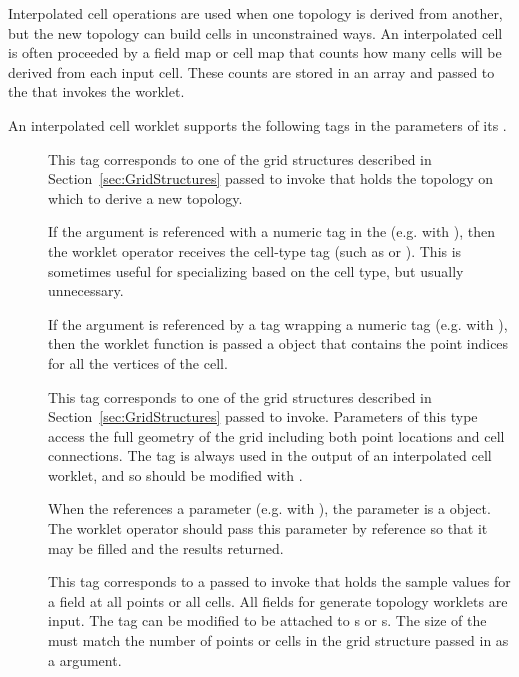 Interpolated cell operations are used when one topology is derived from
another, but the new topology can build cells in unconstrained ways. An
interpolated cell is often proceeded by a field map or cell map that counts
how many cells will be derived from each input cell. These counts are
stored in an array and passed to the 
that invokes the worklet.

An interpolated cell worklet supports the following tags in the parameters
of its \controlsignature.
\begin{description}
\item[] This tag corresponds to one of the grid structures
  described in Section~\ref{sec:GridStructures} passed to invoke that holds
  the topology on which to derive a new topology.

  If the  argument is referenced with a numeric tag in the
  \executionsignature (e.g. with ), then the worklet operator
  receives the cell-type tag (such as  or
  ). This is sometimes useful for specializing   based
  on the cell type, but usually unnecessary.

  If the  argument is referenced by a 
  tag wrapping a numeric tag (e.g. with ), then
  the worklet function is passed a  object that
  contains the point indices for all the vertices of the cell.
\item[] This tag corresponds to one of the grid structures
  described in Section~\ref{sec:GridStructures} passed to
  invoke. Parameters of this type access the full geometry of the grid
  including both point locations and cell connections. The
   tag is always used in the output of an interpolated
  cell worklet, and so should be modified with .

  When the \executionsignature references a \controlsignature
   parameter (e.g. with ), the parameter is a
   object. The worklet operator should pass
  this parameter by reference so that it may be filled and the results
  returned.
\item[] This tag corresponds to a 
  passed to invoke that holds the sample values for a field at all points
  or all cells. All fields for generate topology worklets are input. The
   tag can be modified to be attached to s or
  s. The size of the  must match the
  number of points or cells in the grid structure passed in as a
   argument.


\end{description}
